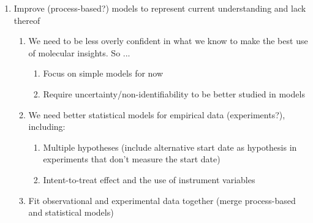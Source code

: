 \documentclass[11pt,letter]{article}
\begin{document}
\begin{enumerate}
\begin{enumerate}
\begin{enumerate}
\end{enumerate}
\end{enumerate}
\item Improve (process-based?) models to represent current understanding and lack thereof 
\begin{enumerate}
\item We need to be less overly confident in what we know to make the best use of molecular insights. So ...
\begin{enumerate}
\item Focus on simple models for now
\item Require uncertainty/non-identifiability to be better studied in models 
\end{enumerate}
\item We need better statistical models for empirical data (experiments?), including:
\begin{enumerate}
\item Multiple hypotheses (include alternative start date as hypothesis in experiments that don't measure the start date)
\item Intent-to-treat effect and the use of instrument variables
\end{enumerate}
\item Fit observational and experimental data together (merge process-based and statistical models)
\end{enumerate}
\end{enumerate}
\end{document}
